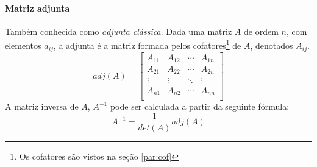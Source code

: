 \paragraph*{Matriz adjunta} Também conhecida como \textit{adjunta clássica}. Dada uma matriz $A$ de ordem $n$, com elementos $a_{ij}$, a adjunta é a matriz formada pelos cofatores\footnote{Os cofatores são vistos na seção \ref{par:cof}} de $A$, denotados $A_{ij}$.
\begin{displaymath}
    adj(A)= 
    \begin{bmatrix}
    A_{11} & A_{12} & \cdots & A_{1n}\\
    A_{21} & A_{22} & \cdots & A_{2n}\\
    \vdots & \vdots & \ddots & \vdots \\
    A_{n1} & A_{n2} & \cdots & A_{nn}\\
    \end{bmatrix}
\end{displaymath}
A matriz inversa de $A$, $A^{-1}$ pode ser calculada a partir da seguinte fórmula:
\begin{displaymath}
    A^{-1}=\frac{1}{det(A)}adj(A)
\end{displaymath}
